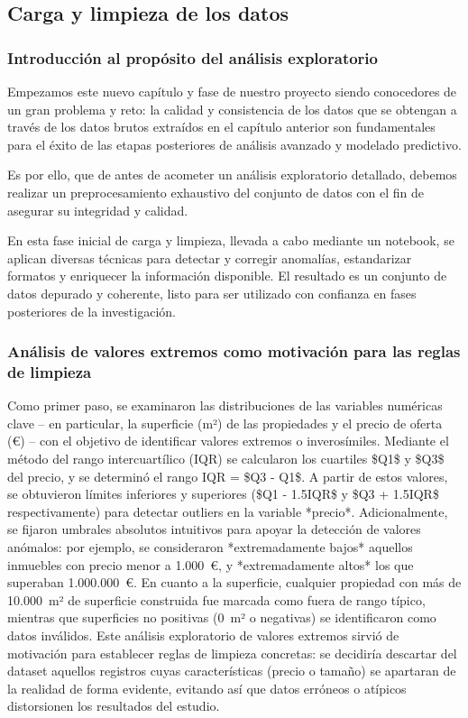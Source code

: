 
\subsection{Carga y limpieza de los datos}

\subsubsection{Introducción al propósito del análisis exploratorio}
Empezamos este nuevo capítulo y fase de nuestro proyecto siendo conocedores de un gran problema y reto: la calidad y consistencia de los datos que se obtengan a través de los datos brutos extraídos en el capítulo anterior son fundamentales para el éxito de las etapas posteriores de análisis avanzado y modelado predictivo. 

Es por ello, que de  antes de acometer un análisis exploratorio detallado, debemos realizar un preprocesamiento exhaustivo del conjunto de datos con el fin de asegurar su integridad y calidad. 

En esta fase inicial de carga y limpieza, llevada a cabo mediante un notebook, se aplican diversas técnicas para detectar y corregir anomalías, estandarizar formatos y enriquecer la información disponible. El resultado es un conjunto de datos depurado y coherente, listo para ser utilizado con confianza en fases posteriores de la investigación. 

\subsubsection{Análisis de valores extremos como motivación para las reglas de limpieza}
Como primer paso, se examinaron las distribuciones de las variables numéricas clave – en particular, la superficie (m²) de las propiedades y el precio de oferta (€) – con el objetivo de identificar valores extremos o inverosímiles. Mediante el método del rango intercuartílico (IQR) se calcularon los cuartiles \$Q1\$ y \$Q3\$ del precio, y se determinó el rango IQR = \$Q3 - Q1\$. A partir de estos valores, se obtuvieron límites inferiores y superiores (\$Q1 - 1.5\cdot IQR\$ y \$Q3 + 1.5\cdot IQR\$ respectivamente) para detectar outliers en la variable *precio*. Adicionalmente, se fijaron umbrales absolutos intuitivos para apoyar la detección de valores anómalos: por ejemplo, se consideraron *extremadamente bajos* aquellos inmuebles con precio menor a 1.000 €, y *extremadamente altos* los que superaban 1.000.000 €. En cuanto a la superficie, cualquier propiedad con más de 10.000 m² de superficie construida fue marcada como fuera de rango típico, mientras que superficies no positivas (0 m² o negativas) se identificaron como datos inválidos. Este análisis exploratorio de valores extremos sirvió de motivación para establecer reglas de limpieza concretas: se decidiría descartar del dataset aquellos registros cuyas características (precio o tamaño) se apartaran de la realidad de forma evidente, evitando así que datos erróneos o atípicos distorsionen los resultados del estudio.

